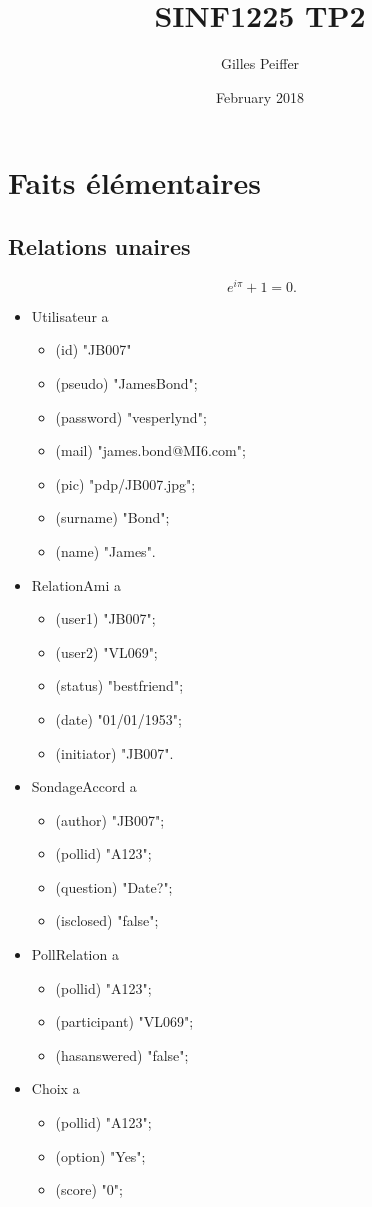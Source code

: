\documentclass{article}
\title{SINF1225 TP2}
\author{Gilles Peiffer}
\date{February 2018}
\begin{document}
\maketitle

\section{Faits élémentaires}

\subsection{Relations unaires}

$$\phantom{.} e^{i\pi} + 1 = 0.$$
\begin{itemize}
    \item Utilisateur a
        \begin{itemize}
        \item (id) "JB007"
        \item (pseudo) "JamesBond";
        \item (password) "vesperlynd";
        \item (mail) "james.bond@MI6.com";
        \item (pic) "pdp/JB007.jpg";
        \item (surname) "Bond";
        \item (name) "James".
    \end{itemize}
    \item RelationAmi a
    \begin{itemize}
        \item (user1) "JB007";
        \item (user2) "VL069";
        \item (status) "bestfriend";
        \item (date) "01/01/1953";
        \item (initiator) "JB007".
    \end{itemize}
    \item SondageAccord a
    \begin{itemize}
        \item (author) "JB007";
        \item (pollid) "A123";
        \item (question) "Date?";
        \item (isclosed) "false";
    \end{itemize}
    \item PollRelation a
    \begin{itemize}
        \item (pollid) "A123";
        \item (participant) "VL069";
        \item (hasanswered) "false";
    \end{itemize}
    \item Choix a
    \begin{itemize}
        \item (pollid) "A123";
        \item (option) "Yes";
        \item (score) "0";
    \end{itemize}
\end{itemize}
\end{document}
